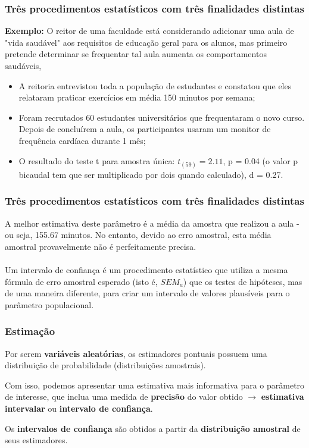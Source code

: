 \documentclass[11pt]{beamer}
\begin{document}
\begin{frame}
\frametitle{Três procedimentos estatísticos com três finalidades distintas}

\textbf{Exemplo:} O reitor de uma faculdade está considerando adicionar uma aula de "vida saudável" aos requisitos de educação geral para os alunos, mas primeiro pretende determinar se frequentar tal aula aumenta os comportamentos saudáveis,

\begin{itemize}
\item A reitoria entrevistou toda a população de estudantes e constatou que eles relataram praticar exercícios em média 150 minutos por semana;
\item Foram recrutados 60 estudantes universitários que frequentaram o novo curso. Depois de concluírem a aula, os participantes usaram um monitor de frequência cardíaca durante 1 mês;
\item O resultado do teste t para amostra única: \(t_{(59)} = 2.11\), p = 0.04 (o valor p bicaudal tem que ser multiplicado por dois quando calculado), d = 0.27.
\end{itemize}

\end{frame}

\begin{frame}
\frametitle{Três procedimentos estatísticos com três finalidades distintas}

A melhor estimativa deste parâmetro é a média da amostra que realizou a aula - ou seja, 155.67 minutos. No entanto, devido ao erro amostral, esta média amostral provavelmente não é perfeitamente precisa.\\~\\

Um intervalo de confiança é um procedimento estatístico que utiliza a mesma fórmula de erro amostral esperado (isto é, \(SEM_a\)) que os testes de hipóteses, mas de uma maneira diferente, para criar um intervalo de valores plausíveis para o parâmetro populacional.

\end{frame}

\begin{frame}
\frametitle{Estimação}

Por serem \textbf{variáveis aleatórias}, os estimadores pontuais possuem
uma distribuição de probabilidade (distribuições amostrais).

Com isso, podemos apresentar uma estimativa mais informativa para o
parâmetro de interesse, que inclua uma medida de \textbf{precisão} do
valor obtido \(\rightarrow\) \textbf{estimativa intervalar} ou
\textbf{intervalo de confiança}.

Os \textbf{intervalos de confiança} são obtidos a partir da
\textbf{distribuição amostral} de seus estimadores.
\end{frame}
\end{document}
